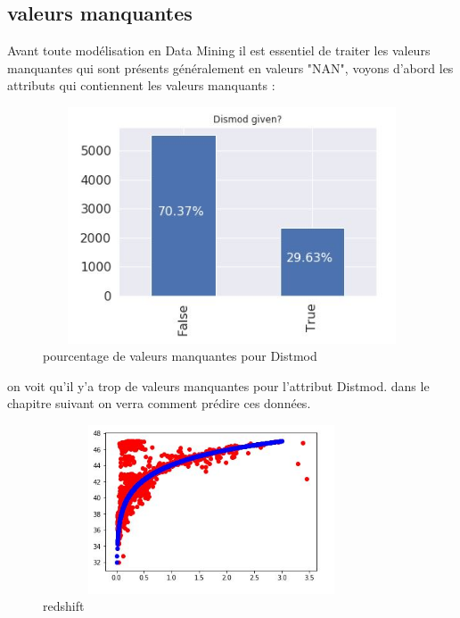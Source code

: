 \subsection{valeurs manquantes}
Avant toute modélisation en Data Mining il est essentiel de traiter les valeurs manquantes qui sont présents généralement en valeurs "NAN", voyons d'abord les attributs qui contiennent les valeurs manquants :

\begin{figure}[!h]
    \centering
    \includegraphics[width=12cm,height=7cm]{report/figures/distmod.jpg}
    \caption{pourcentage de valeurs manquantes pour Distmod}
    \label{fig:my_label}
\end{figure}

on voit qu'il y'a trop de valeurs manquantes pour l'attribut Distmod. dans le chapitre suivant on verra comment prédire ces données. 



\begin{figure}[!h]
    \centering
    \includegraphics[width=10cm,height=5cm]{report/figures/redshift.jpg}
    \caption{redshift}
    \label{fig:my_label}
\end{figure}
\newline














